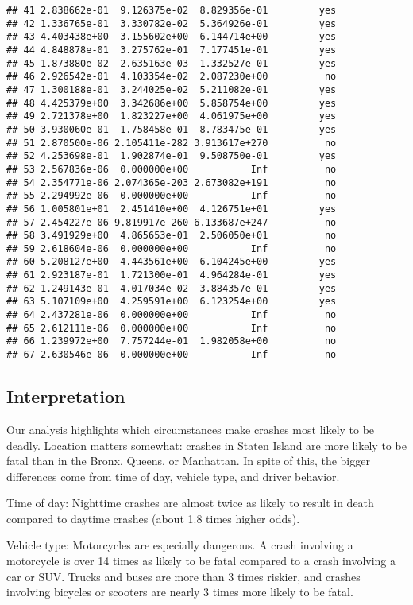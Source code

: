 \documentclass[10pt]{article}\usepackage[]{graphicx}\usepackage[]{xcolor}
\makeatletter
\newenvironment{kframe}{%
 \def\at@end@of@kframe{}%
 \ifinner\ifhmode%
  \def\at@end@of@kframe{\end{minipage}}%
  \begin{minipage}{\columnwidth}%
 \fi\fi%
 \def\FrameCommand##1{\hskip\@totalleftmargin \hskip-\fboxsep
 \colorbox{shadecolor}{##1}\hskip-\fboxsep
     \hskip-\linewidth \hskip-\@totalleftmargin \hskip\columnwidth}%
 \MakeFramed {\advance\hsize-\width
   \@totalleftmargin\z@ \linewidth\hsize
   \@setminipage}}%
 {\par\unskip\endMakeFramed%
 \at@end@of@kframe}
\newenvironment{knitrout}{}{} %
\makeatother
\begin{document}
\begin{knitrout}
\begin{kframe}
\begin{verbatim}
## 41 2.838662e-01  9.126375e-02  8.829356e-01         yes
## 42 1.336765e-01  3.330782e-02  5.364926e-01         yes
## 43 4.403438e+00  3.155602e+00  6.144714e+00         yes
## 44 4.848878e-01  3.275762e-01  7.177451e-01         yes
## 45 1.873880e-02  2.635163e-03  1.332527e-01         yes
## 46 2.926542e-01  4.103354e-02  2.087230e+00          no
## 47 1.300188e-01  3.244025e-02  5.211082e-01         yes
## 48 4.425379e+00  3.342686e+00  5.858754e+00         yes
## 49 2.721378e+00  1.823227e+00  4.061975e+00         yes
## 50 3.930060e-01  1.758458e-01  8.783475e-01         yes
## 51 2.870500e-06 2.105411e-282 3.913617e+270          no
## 52 4.253698e-01  1.902874e-01  9.508750e-01         yes
## 53 2.567836e-06  0.000000e+00           Inf          no
## 54 2.354771e-06 2.074365e-203 2.673082e+191          no
## 55 2.294992e-06  0.000000e+00           Inf          no
## 56 1.005801e+01  2.451410e+00  4.126751e+01         yes
## 57 2.454227e-06 9.819917e-260 6.133687e+247          no
## 58 3.491929e+00  4.865653e-01  2.506050e+01          no
## 59 2.618604e-06  0.000000e+00           Inf          no
## 60 5.208127e+00  4.443561e+00  6.104245e+00         yes
## 61 2.923187e-01  1.721300e-01  4.964284e-01         yes
## 62 1.249143e-01  4.017034e-02  3.884357e-01         yes
## 63 5.107109e+00  4.259591e+00  6.123254e+00         yes
## 64 2.437281e-06  0.000000e+00           Inf          no
## 65 2.612111e-06  0.000000e+00           Inf          no
## 66 1.239972e+00  7.757244e-01  1.982058e+00          no
## 67 2.630546e-06  0.000000e+00           Inf          no
\end{verbatim}
\end{kframe}
\end{knitrout}

\subsection{Interpretation}
Our analysis highlights which circumstances make crashes most likely to be deadly. Location matters somewhat: crashes in Staten Island are more likely to be fatal than in the Bronx, Queens, or Manhattan. In spite of this, the bigger differences come from time of day, vehicle type, and driver behavior.

Time of day: Nighttime crashes are almost twice as likely to result in death compared to daytime crashes (about 1.8 times higher odds).

Vehicle type: Motorcycles are especially dangerous. A crash involving a motorcycle is over 14 times as likely to be fatal compared to a crash involving a car or SUV. Trucks and buses are more than 3 times riskier, and crashes involving bicycles or scooters are nearly 3 times more likely to be fatal.
\end{document}
